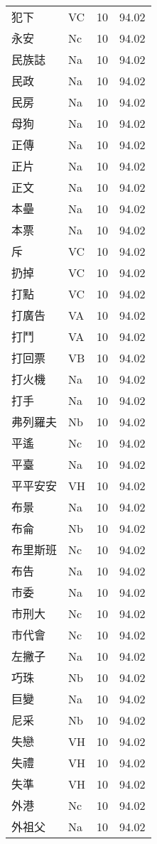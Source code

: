 \documentclass[twocolumn]{book}
\begin{document}
\begin{supertabular}{llrr}
犯下 & VC & 10 &  94.02\\
永安 & Nc & 10 &  94.02\\
民族誌 & Na & 10 &  94.02\\
民政 & Na & 10 &  94.02\\
民房 & Na & 10 &  94.02\\
母狗 & Na & 10 &  94.02\\
正傳 & Na & 10 &  94.02\\
正片 & Na & 10 &  94.02\\
正文 & Na & 10 &  94.02\\
本壘 & Na & 10 &  94.02\\
本票 & Na & 10 &  94.02\\
斥 & VC & 10 &  94.02\\
扔掉 & VC & 10 &  94.02\\
打點 & VC & 10 &  94.02\\
打廣告 & VA & 10 &  94.02\\
打鬥 & VA & 10 &  94.02\\
打回票 & VB & 10 &  94.02\\
打火機 & Na & 10 &  94.02\\
打手 & Na & 10 &  94.02\\
弗列羅夫 & Nb & 10 &  94.02\\
平遙 & Nc & 10 &  94.02\\
平臺 & Na & 10 &  94.02\\
平平安安 & VH & 10 &  94.02\\
布景 & Na & 10 &  94.02\\
布侖 & Nb & 10 &  94.02\\
布里斯班 & Nc & 10 &  94.02\\
布告 & Na & 10 &  94.02\\
市委 & Na & 10 &  94.02\\
市刑大 & Nc & 10 &  94.02\\
市代會 & Nc & 10 &  94.02\\
左撇子 & Na & 10 &  94.02\\
巧珠 & Nb & 10 &  94.02\\
巨變 & Na & 10 &  94.02\\
尼采 & Nb & 10 &  94.02\\
失戀 & VH & 10 &  94.02\\
失禮 & VH & 10 &  94.02\\
失準 & VH & 10 &  94.02\\
外港 & Nc & 10 &  94.02\\
外祖父 & Na & 10 &  94.02\\

\end{supertabular}
\end{document}

